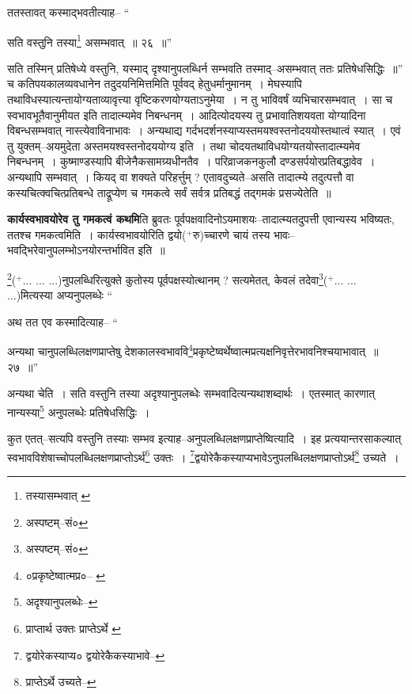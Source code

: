 \documentclass[article,12pt,a4paper]{memoir}
\newcommand{\add}[1]{($^{+}$#1)}
\begin{document}
	ततस्तावत् कस्माद्भवतीत्याह-- “
	  
	सति वस्तुनि तस्या\footnote{तस्यासम्भवात् \cite{dp-msC}} असम्भवात् ॥ २६ ॥” 
	  
	सति तस्मिन् प्रतिषेध्ये वस्तुनि, यस्माद् दृश्यानुपलब्धिर्न सम्भवति तस्माद्--असम्भवात् ततः प्रतिषेधसिद्धिः ॥” च कतिपयकालव्यवधानेन तदुदयनिमित्तमिति पूर्ववद् हेतुधर्मानुमानम् । मेघस्यापि तथाविधस्यात्यन्तायोग्यताव्यावृत्त्या वृष्टिकरणयोग्यताऽनुमेया । न तु भाविवर्षं व्यभिचारसम्भवात् । सा च स्वभावभूतैवानुमीयत इति तादात्म्यमेव निबन्धनम् । आदित्योदयस्य तु प्रभावातिशयवता योग्यादिना विबन्धसम्भवात् नास्त्येवाविनाभावः । अन्यथाद्य गर्दभदर्शनस्याप्यस्तमयश्वस्तनोदययोस्तथात्वं स्यात् । एवं तु युक्तम्--अयमुदेता अस्तमयश्वस्तनोदययोग्य इति । तथा चोदयतथाविधयोग्यतयोस्तादात्म्यमेव निबन्धनम् । कुष्माण्डस्यापि बीजेनैकसामग्र्यधीनतैव । परिव्राजकनकुलौ दण्डसर्पयोरप्रतिबद्धावेव । अन्यथापि सम्भवात् । कियद् वा शक्यते परिहर्त्तुम् ? एतावदुच्यते--असति तादात्म्ये तदुत्पत्तौ वा कस्यचित्क्वचित्प्रतिबन्धे ताद्रूप्येण च गमकत्वे सर्वं सर्वत्र प्रतिबद्धं तद्गमकं प्रसज्येतेति ॥
	\pend
      

	  \pstart \textbf{कार्यस्वभावयोरेव तु गमकत्वं कथमि}ति ब्रुवतः पूर्वपक्षवादिनोऽयमाशयः--तादात्म्यतदुपत्ती एवान्यस्य भविष्यतः, ततश्च गमकत्वमिति । कार्यस्वभावयोरिति द्वयो\add{रु}च्चारणे चायं तस्य भावः--भवद्भिरेवानुपलम्भोऽनयोरन्तर्भावित इति ॥
	\pend
      

	  \pstart \footnote{अस्पष्टम्--सं०}\add{... ... ...}नुपलब्धिरित्युक्ते कुतोस्य पूर्वपक्षस्योत्थानम् ? सत्यमेतत्, केवलं तदेवा\footnote{अस्पष्टम्--सं०}\add{... ... ...}मित्यस्या अप्यनुपल\leavevmode{}ब्धेः  \leavevmode{} “
	  
	अथ तत एव कस्मादित्याह-- “
	  
	अन्यथा चानुपलब्धिलक्षणप्राप्तेषु देशकालस्वभाववि\footnote{०प्रकृष्टेष्वात्मप्र०--\cite{dp-msB} \cite{dp-edP} \cite{dp-edH} \cite{dp-edE} \cite{dp-edN}}\-प्रकृष्टेष्वर्थेष्वात्मप्रत्यक्षनिवृत्तेरभावनिश्चयाभावात् ॥ २७ ॥” 
	  
	अन्यथा चेति । सति वस्तुनि तस्या अदृश्यानुपलब्धेः सम्भवादित्यन्यथाशब्दार्थः । एतस्मात् कारणात् नान्यस्या\footnote{अदृश्यानुपलब्धेः--\cite{dp-msD-n}} अनुपलब्धेः प्रतिषेधसिद्धिः । 
	  
	कुत एतत्--सत्यपि वस्तुनि तस्याः सम्भव इत्याह--अनुपलब्धिलक्षणप्राप्तेष्वित्यादि । इह प्रत्ययान्तरसाकल्यात् स्वभावविशेषाच्चोपलब्धिलक्षणप्राप्तोऽर्थ\footnote{प्राप्तार्थ उक्तः \cite{dp-msA} \cite{dp-msB} \cite{dp-edP} \cite{dp-edH} प्राप्तेऽर्थे \cite{dp-msC}} उक्तः । \footnote{द्वयोरेकस्याप्य० \cite{dp-msB} द्वयोरेकैकस्याभावे--\cite{dp-msC}}\-द्वयोरेकैकस्याप्यभावेऽनुपलब्धिलक्षणप्राप्तोऽर्थ\footnote{प्राप्तेऽर्थे उच्यते--\cite{dp-msC}} उच्यते । 
	  
\end{document}

